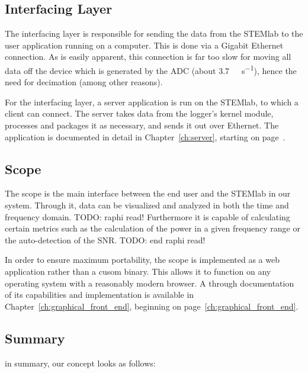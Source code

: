 \subsection{Interfacing Layer} %
\label{subsec:concept:interfacing_layer}

The interfacing layer is responsible for  sending the data from the STEMlab to
the  user application  running  on  a computer. This  is  done  via a  Gigabit
Ethernet connection. As  is easily apparent,  this connection is far  too slow
for  moving all  data off  the device  which is  generated by  the ADC  (about
\SI{3.7}{\gibi\byte\per\second}), hence  the need for decimation  (among other
reasons).

For the  interfacing layer,  a server  application is run  on the  STEMlab, to
which a  client can connect. The  server takes  data from the  logger's kernel
module,  processes  and packages  it  as  necessary,  and  sends it  out  over
Ethernet.  The application is documented in detail in Chapter~\ref{ch:server},
starting on page~\pageref{ch:server}.


\subsection{Scope} %
\label{subsec:concept:scope}

The scope is the main interface between the end user and the STEMlab in our
system. Through it, data can be visualized and analyzed in both the time and
frequency domain.
TODO: raphi read!
Furthermore it is capable of calculating certain metrics such as the calculation of the power in a given frequency range or the auto-detection of the SNR.
TODO: end raphi read!

In  order  to  ensure  maximum   portability,  the  scope  is  implemented  as
a   web   application   rather   than   a   cusom   binary. This   allows   it
to   function   on   any   operating   system   with   a   reasonably   modern
browser. A  through  documentation  of  its  capabilities  and  implementation
is   available    in   Chapter~\ref{ch:graphical_front_end},    beginning   on
page~\ref{ch:graphical_front_end}.

\subsection{Summary} %
\label{subsec:concept:summary}

in summary, our concept looks as follows:

